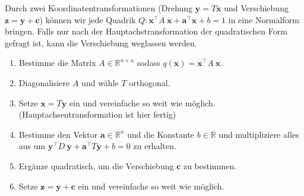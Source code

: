 \begin{tcolorbox}[colback=gray!30, colframe=gray!80, title=Quadriken in Normalform bringen]
    Durch zwei Koordinatentransformationen (Drehung \( \mathbf{y} = T\mathbf{x} \) und Verschiebung \( \mathbf{z} = \mathbf{y} + \mathbf{c} \)) können wir jede Quadrik \( Q: \mathbf{x}^\top A \ \mathbf{x} + \mathbf{a}^\top \mathbf{x} + b = 1 \) in eine Normalform bringen. Falls nur nach der Hauptachstransformation der quadratischen Form gefragt ist, kann die Verschiebung weglassen werden.
    \begin{enumerate}
        \item Bestimme die Matrix \( A \in \mathbb{R}^{n \times n} \) sodass \( q(\mathbf{x}) = \mathbf{x}^\top A \ \mathbf{x} \).
        \item Diagonalisiere \( A \) und wähle \( T \) orthogonal. 
        \item Setze \( \mathbf{x} = T \mathbf{y} \) ein und vereinfache so weit wie möglich. (Hauptachsentransformation ist hier fertig)
        \item Bestimme den Vektor \( \mathbf{a} \in \mathbb{R}^n \) und die Konstante \( b \in \mathbb{R} \) und multipliziere alles aus um \( \mathbf{y}^\top D \ \mathbf{y} + \mathbf{a}^\top T \mathbf{y} + b = 0 \) zu erhalten.
        \item Ergänze quadratisch, um die Verschiebung \( \mathbf{c} \) zu bestimmen. 
        \item Setze \( \mathbf{z} = \mathbf{y} + \mathbf{c} \) ein und vereinfache so weit wie möglich. 
    \end{enumerate}
\end{tcolorbox}